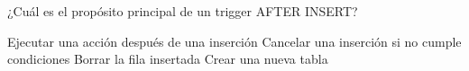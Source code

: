 \question[1] ¿Cuál es el propósito principal de un trigger AFTER INSERT?
\begin{choices}
\CorrectChoice Ejecutar una acción después de una inserción
\choice Cancelar una inserción si no cumple condiciones
\choice Borrar la fila insertada
\choice Crear una nueva tabla
\end{choices}